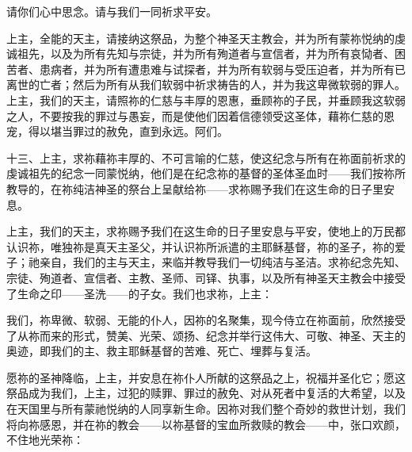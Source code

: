 \par

请你们心中思念。请与我们一同祈求平安。\par

\par

上主，全能的天主，请接纳这祭品，为整个神圣天主教会，并为所有蒙祢悦纳的虔诚祖先，以及为所有先知与宗徒，并为所有殉道者与宣信者，并为所有哀恸者、困苦者、患病者，并为所有遭患难与试探者，并为所有软弱与受压迫者，并为所有已离世的亡者；然后为所有从我们软弱中祈求祷告的人，并为我这卑微软弱的罪人。上主，我们的天主，请照祢的仁慈与丰厚的恩惠，垂顾祢的子民，并垂顾我这软弱之人，不要按我的罪过与愚妄，而是使他们因着信德领受这圣体，藉祢仁慈的恩宠，得以堪当罪过的赦免，直到永远。阿们。\par

\par

十三、上主，求祢藉祢丰厚的、不可言喻的仁慈，使这纪念与所有在祢面前祈求的虔诚祖先的纪念一同蒙悦纳，他们是在纪念祢的基督的圣体圣血时——我们按祢所教导的，在祢纯洁神圣的祭台上呈献给祢——求祢赐予我们在这生命的日子里安息。\par

\par

上主，我们的天主，求祢赐予我们在这生命的日子里安息与平安，使地上的万民都认识祢，唯独祢是真天主圣父，并认识祢所派遣的主耶稣基督，祢的圣子，祢的爱子；祂亲自，我们的主与天主，来临并教导我们一切纯洁与圣洁。求祢纪念先知、宗徒、殉道者、宣信者、主教、圣师、司铎、执事，以及所有神圣天主教会中接受了生命之印——圣洗——的子女。我们也求祢，上主：\par

\par

我们，祢卑微、软弱、无能的仆人，因祢的名聚集，现今侍立在祢面前，欣然接受了从祢而来的形式，赞美、光荣、颂扬、纪念并举行这伟大、可敬、神圣、天主的奥迹，即我们的主、救主耶稣基督的苦难、死亡、埋葬与复活。\par

愿祢的圣神降临，上主，并安息在祢仆人所献的这祭品之上，祝福并圣化它；愿这祭品成为我们，上主，过犯的赎罪、罪过的赦免、对从死者中复活的大希望，以及在天国里与所有蒙祂悦纳的人同享新生命。因祢对我们整个奇妙的救世计划，我们将向祢感恩，并在祢的教会——以祢基督的宝血所救赎的教会——中，张口欢颜，不住地光荣祢：\par

